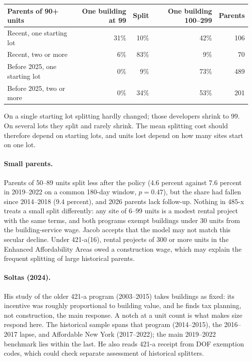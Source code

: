 \begin{center}
\small
\begin{tabular}{lrrrr}
\hline
Parents of 90+ units & One building at 99 & Split & One building 100--299 & Parents \\
\hline
Recent, one starting lot & 31\% & 10\% & 42\% & 106 \\
Recent, two or more & 6\% & 83\% & 9\% & 70 \\
Before 2025, one starting lot & 0\% & 9\% & 73\% & 489 \\
Before 2025, two or more & 0\% & 34\% & 53\% & 201 \\
\hline
\end{tabular}
\end{center}

On a single starting lot splitting hardly changed; those developers shrink to
99. On several lots they split and rarely shrink. The mean splitting cost
should therefore depend on starting lots, and units lost depend on how many
sites start on one lot.

\paragraph{Small parents.} Parents of 50--89 units split less after the policy
(4.6 percent against 7.6 percent in 2019--2022 on a common 180-day window,
$p = 0.47$), but the share had fallen since 2014--2018 (9.4 percent), and 2026
parents lack follow-up. Nothing in 485-x treats a small split differently: any
site of 6--99 units is a modest rental project with the same terms, and both
programs exempt buildings under 30 units from the building-service wage. Jacob
accepts that the model may not match this secular decline. Under 421-a(16),
rental projects of 300 or more units in the Enhanced Affordability Areas owed a
construction wage, which may explain the frequent splitting of large historical
parents.

\paragraph{Soltas (2024).} His study of the older 421-a program (2003--2015)
takes buildings as fixed: its incentive was roughly proportional to building
value, and he finds tax planning, not construction, the main response. A notch
at a unit count is what makes size respond here. The historical sample spans
that program (2014--2015), the 2016--2017 lapse, and Affordable New York
(2017--2022); the main 2019--2022 benchmark lies within the last. He also reads
421-a receipt from DOF exemption codes, which could check separate assessment
of historical splitters.

